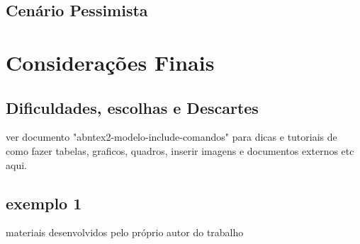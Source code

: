 \documentclass[
12pt,				%
openany,			%
oneside,			%
a4paper,			%
english,			%
french,				%
spanish,			%
brazil				%
]{abntex2}
\begin{document}
	\section{Cenário Pessimista}
	
	\chapter{Considerações Finais}
	\section{Dificuldades, escolhas e Descartes}
	\cite{ibge1993}
	
	ver documento "abntex2-modelo-include-comandos" para dicas e tutoriais de como fazer tabelas, graficos, quadros, inserir imagens e documentos externos etc aqui. 
	
	\renewcommand{\bibname}{Referências Bibliográficas} %
	
	
	
	
	
	
	
	\begin{apendicesenv}
		
		\partapendices
		
		\chapter{exemplo 1}
		
		materiais desenvolvidos pelo próprio autor do trabalho
		
	\end{apendicesenv}
	
	
\end{document}
